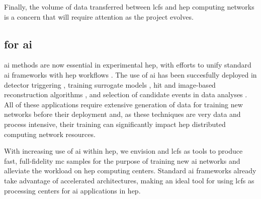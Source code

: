 Finally, the volume of data transferred between \acp{lcf} and \ac{hep} computing
networks is a concern that will require attention as the project evolves.

\subsection{\celeritas for \ac{ai}}
\label{sec:celeritas-ai}

\ac{ai} methods are now essential in experimental \ac{hep}, with efforts to
unify standard \ac{ai} frameworks with \ac{hep} workflows \cite{mlaas4hep}. The
use of \ac{ai} has been succesfully deployed in detector triggering
\cite{ml-trigger}, training surrogate models \cite{fastcalogan}, hit and
image-based reconstruction algorithms \cite{gnn-reco-cms,jets-deep-learning},
and selection of candidate events in data analyses \cite{cvn-nova}. All of these
applications require extensive generation of data for training new networks
before their deployment and, as these techniques are very data and process
intensive, their training can significantly impact \ac{hep} distributed
computing network resources.

With increasing use of \ac{ai} within \ac{hep}, we envision \celeritas and
\acp{lcf} as tools to produce fast, full-fidelity \ac{mc} samples for the
purpose of training new \ac{ai} networks and alleviate the workload on \ac{hep}
computing centers. Standard \ac{ai} frameworks already take advantage of
accelerated architectures, making \celeritas an ideal tool for using \acp{lcf}
as processing centers for \ac{ai} applications in \ac{hep}.
